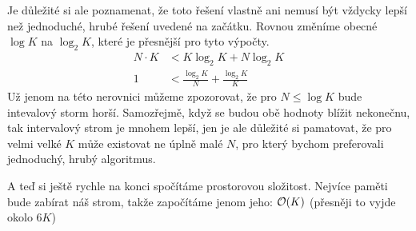 \documentclass{../../../ksp}
\begin{document}
Je důležité si ale poznamenat, že toto řešení vlastně ani nemusí být vždycky lepší než jednoduché, hrubé řešení uvedené na začátku.
Rovnou změníme obecné $\log{K}$ na $\log_2{K}$, které je přesnější pro tyto výpočty.
\begin{equation}
    \begin{split}
        N \cdot K & < K\log_2{K} + N\log_2{K}\\
        1 & < \frac{\log_2{K}}{N} + \frac{\log_2{K}}{K}
    \end{split}
\end{equation}
Už jenom na této nerovnici můžeme zpozorovat, že pro $N \leq \log{K}$ bude intevalový storm horší.
Samozřejmě, když se budou obě hodnoty blížit nekonečnu, tak intervalový strom je mnohem lepší, jen je ale
důležité si pamatovat, že pro velmi velké $K$ může existovat ne úplně malé $N$, pro který bychom preferovali
jednoduchý, hrubý algoritmus.

A teď si ještě rychle na konci spočítáme prostorovou složitost. Nejvíce paměti bude zabírat náš strom,
takže započítáme jenom jeho: $\mathcal{O}(K)$ (přesněji to vyjde okolo $6K$)
\end{document}
